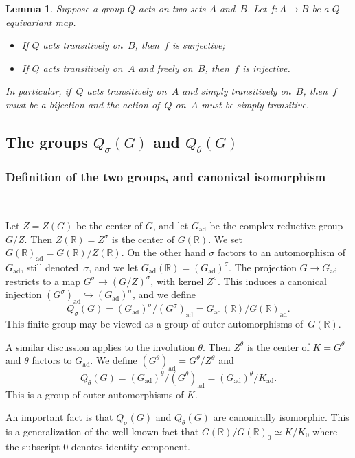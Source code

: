 \documentclass[cupthm]{CUP-JNL-JMJ}
\numberwithin{equation}{section}
\theoremstyle{cupplain}
\newtheorem{lemma}[theorem]{Lemma}
\theoremstyle{cupdefinition}
\theoremstyle{cupremark}
\theoremstyle{cupproof}
\newcommand{\ad}{\mathrm{ad}}
\newcommand{\Gad}{G_\mathrm{ad}}
\newcommand{\Kad}{K_\mathrm{ad}}
\newcommand{\R}{\mathbb R}
\newcommand{\G}{G}
\begin{document}
\begin{lemma} Suppose a group $Q$ acts on two sets $A$ and~$B$. Let $f\colon A \to B$ be a $Q$-equivariant map. 
\begin{itemize}
\item[(a)] If $Q$ acts transitively on~$B$,  then~$f$ is surjective\textup{;}
\item[(b)] If $Q$ acts transitively on~$A$ and freely on~$B$, then~$f$ is injective.
\end{itemize}
In particular, if~$Q$ acts transitively on~$A$ and simply transitively on~$B$, then~$f$ must be a bijection and the action of~$Q$ on~$A$ must be simply transitive.
\end{lemma}

\subsection{The groups $Q_\sigma(G)$ and $Q_{\theta}(G)$}

\subsubsection{Definition of the two groups, and canonical isomorphism}~

Let $Z=Z(G)$ be the center of $G$, and let $\Gad$ be the complex reductive group~$G/Z$.
Then $Z(\R)=Z^\sigma$ is the center of $G(\R)$. We set $\G(\R)_\ad=G(\R)/Z(\R)$.
On the other hand  $\sigma$ factors to an automorphism  of $\Gad$, still denoted~$\sigma$, and we let  $\Gad(\R)=(\Gad)^\sigma$.
The projection $G\rightarrow \Gad$ restricts to a map $G^\sigma\rightarrow (G/Z)^\sigma$, with kernel $Z^\sigma$.
This induces a canonical injection $(G^\sigma)_\ad\hookrightarrow (\Gad)^\sigma$, and we define
$$
Q_\sigma(G)=(\Gad)^\sigma/(G^\sigma)_\ad=\Gad(\R)/\G(\R)_\ad.
$$
This finite group may be viewed as a group of outer automorphisms of~$G(\R)$.

A similar discussion applies to the involution $\theta$.
Then $Z^\theta$ is the center of $K=G^\theta$ and  $\theta$ factors to $\Gad$.
We define $(G^\theta)_\ad=G^\theta/Z^\theta$ and
$$
Q_\theta(G)=(\Gad)^\theta/(G^\theta)_\ad =(\Gad)^\theta/\Kad.
$$
This is a group of outer automorphisms of $K$. 

An important fact is that $Q_\sigma(G)$ and $Q_\theta(G)$ are canonically isomorphic. This is a generalization of the well known fact that
$G(\R)/G(\R)_0\simeq K/K_0$ where the subscript $0$ denotes identity component. 
\end{document}
